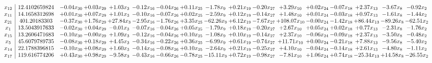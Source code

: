 \documentclass[9pt]{article}
\begin{document}
 \[\begin{array}{c| c c@{\hskip 2pt} c@{\hskip 2pt} c@{\hskip 2pt} c@{\hskip 2pt} c@{\hskip 2pt} c@{\hskip 2pt} c@{\hskip 2pt} c@{\hskip 2pt} c@{\hskip 2pt} c@{\hskip 2pt} c@{\hskip 2pt} c@{\hskip 2pt} c@{\hskip 2pt} c@{\hskip 2pt} c@{\hskip 2pt} }
 x_{12}   &  12.4102659824 & -0.04 x_{30} & +  0.03 x_{29} & +  1.03 x_{3} & -0.12 x_{16} & -0.04 x_{26} & +  0.11 x_{25} & -1.78 x_{9} & +  0.21 x_{19} & -0.20 x_{27} & +  3.29 x_{10} & +  0.02 x_{24} & -0.07 x_{18} & +  2.37 x_{13} & -3.67 x_{8} & -0.92 x_{2}\\
 x_{11}   &  14.1658312698 & +  0.01 x_{30} & +  0.07 x_{29} & +  1.01 x_{3} & -0.10 x_{16} & -0.07 x_{26} & +  0.02 x_{25} & -2.59 x_{9} & +  0.12 x_{19} & -0.14 x_{27} & +  1.48 x_{10} & +  0.01 x_{24} & -0.03 x_{18} & +  0.97 x_{13} & -1.61 x_{8} & -1.44 x_{2}\\
 x_{21}   &  401.20183303 & -0.37 x_{30} & +  1.76 x_{29} & + 27.84 x_{3} & -2.95 x_{16} & -1.76 x_{26} & +  3.35 x_{25} & -62.26 x_{9} & +  6.12 x_{19} & -7.67 x_{27} & + 108.07 x_{10} & -0.00 x_{24} & -1.42 x_{18} & + 86.44 x_{13} & -89.26 x_{8} & -62.51 x_{2}\\
 x_{1}   &  13.5043917633 & -0.02 x_{30} & +  0.04 x_{29} & -0.01 x_{3} & -0.07 x_{16} & -0.04 x_{26} & +  0.05 x_{25} & -1.79 x_{9} & +  0.18 x_{19} & -0.20 x_{27} & +  2.67 x_{10} & +  0.05 x_{24} & +  0.02 x_{18} & +  0.77 x_{13} & -2.31 x_{8} & -1.76 x_{2}\\
 x_{15}   &  13.2606471683 & -0.10 x_{30} & -0.00 x_{29} & +  1.09 x_{3} & -0.12 x_{16} & -0.04 x_{26} & +  0.10 x_{25} & -1.08 x_{9} & +  0.10 x_{19} & -0.14 x_{27} & +  2.37 x_{10} & -0.06 x_{24} & -0.09 x_{18} & +  2.37 x_{13} & -3.50 x_{8} & -0.48 x_{2}\\
 x_{5}   &  45.6079789735 & -0.08 x_{30} & +  0.18 x_{29} & +  4.45 x_{3} & -0.34 x_{16} & -0.22 x_{26} & +  0.36 x_{25} & -6.99 x_{9} & +  0.61 x_{19} & -0.74 x_{27} & + 11.71 x_{10} & +  0.00 x_{24} & -0.21 x_{18} & +  7.88 x_{13} & -9.56 x_{8} & -5.40 x_{2}\\
 x_{14}   &  22.1788396815 & -0.10 x_{30} & +  0.08 x_{29} & +  1.60 x_{3} & -0.14 x_{16} & -0.08 x_{26} & +  0.10 x_{25} & -2.64 x_{9} & +  0.21 x_{19} & -0.25 x_{27} & +  4.10 x_{10} & -0.04 x_{24} & -0.14 x_{18} & +  2.61 x_{13} & -4.80 x_{8} & -1.11 x_{2}\\
 x_{17}   &  119.616774206 & +  0.43 x_{30} & +  0.98 x_{29} & -9.58 x_{3} & -0.43 x_{16} & -0.66 x_{26} & -0.78 x_{25} & -15.11 x_{9} & +  0.72 x_{19} & -0.98 x_{27} & -7.81 x_{10} & +  1.06 x_{24} & +  0.74 x_{18} & -25.34 x_{13} & + 14.58 x_{8} & -26.55 x_{2}\\

\end{array}\]
\end{document}
